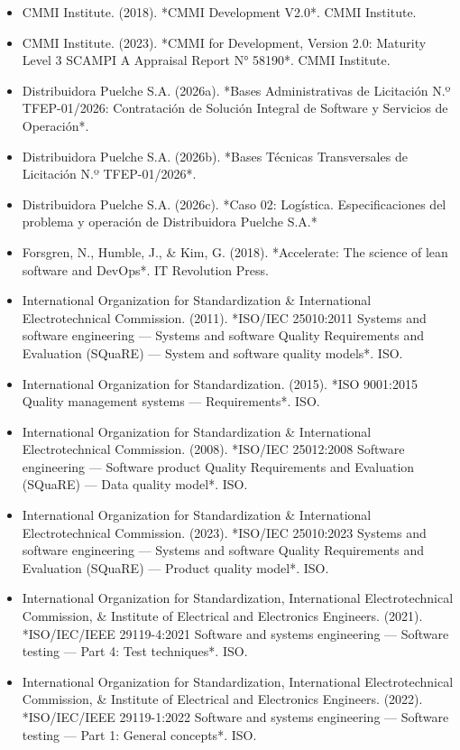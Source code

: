 \begin{itemize}
\item CMMI Institute. (2018). *CMMI Development V2.0*. CMMI Institute.
\item CMMI Institute. (2023). *CMMI for Development, Version 2.0: Maturity Level 3 SCAMPI A Appraisal Report N° 58190*. CMMI Institute.
\item Distribuidora Puelche S.A. (2026a). *Bases Administrativas de Licitación N.º TFEP-01/2026: Contratación de Solución Integral de Software y Servicios de Operación*.
\item Distribuidora Puelche S.A. (2026b). *Bases Técnicas Transversales de Licitación N.º TFEP-01/2026*.
\item Distribuidora Puelche S.A. (2026c). *Caso 02: Logística. Especificaciones del problema y operación de Distribuidora Puelche S.A.*
\item Forsgren, N., Humble, J., \& Kim, G. (2018). *Accelerate: The science of lean software and DevOps*. IT Revolution Press.
\item International Organization for Standardization \& International Electrotechnical Commission. (2011). *ISO/IEC 25010:2011 Systems and software engineering — Systems and software Quality Requirements and Evaluation (SQuaRE) — System and software quality models*. ISO.
\item International Organization for Standardization. (2015). *ISO 9001:2015 Quality management systems — Requirements*. ISO.
\item International Organization for Standardization \& International Electrotechnical Commission. (2008). *ISO/IEC 25012:2008 Software engineering — Software product Quality Requirements and Evaluation (SQuaRE) — Data quality model*. ISO.
\item International Organization for Standardization \& International Electrotechnical Commission. (2023). *ISO/IEC 25010:2023 Systems and software engineering — Systems and software Quality Requirements and Evaluation (SQuaRE) — Product quality model*. ISO.
\item International Organization for Standardization, International Electrotechnical Commission, \& Institute of Electrical and Electronics Engineers. (2021). *ISO/IEC/IEEE 29119-4:2021 Software and systems engineering — Software testing — Part 4: Test techniques*. ISO.
\item International Organization for Standardization, International Electrotechnical Commission, \& Institute of Electrical and Electronics Engineers. (2022). *ISO/IEC/IEEE 29119-1:2022 Software and systems engineering — Software testing — Part 1: General concepts*. ISO.

\end{itemize}
